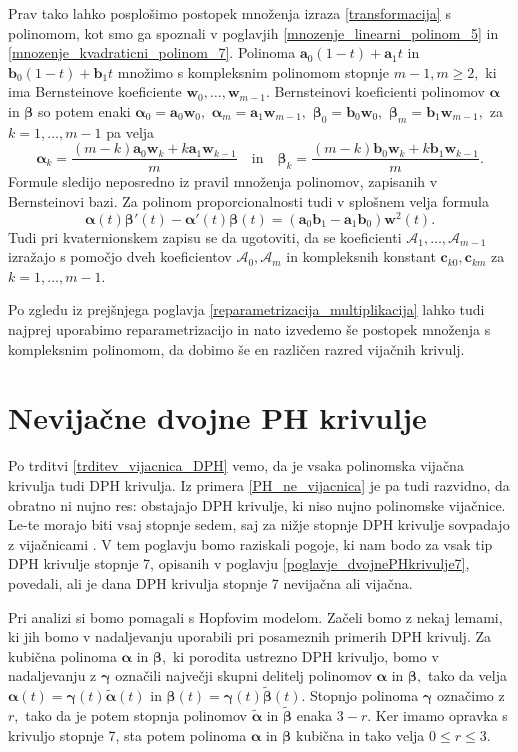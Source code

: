 \documentclass[12pt,a4paper,twoside]{article}
\theoremstyle{definition} %
\theoremstyle{plain} %
\theoremstyle{primerstyle}
\numberwithin{equation}{section}  %
\newcommand{\aV}{\mathbf{a}}
\newcommand{\bV}{\mathbf{b}}
\newcommand{\cV}{\mathbf{c}}
\newcommand{\wV}{\mathbf{w}}
\newcommand{\AQ}{\mathcal{A}}
\newcommand{\balpha}{\boldsymbol \alpha}
\newcommand{\bbeta}{\boldsymbol \beta}
\newcommand{\bgamma}{\boldsymbol \gamma}
\newcommand{\btalpha}{\tilde{\boldsymbol \alpha}}
\newcommand{\btbeta}{\tilde{\boldsymbol \beta}}
\begin{document}
Prav tako lahko posplošimo postopek množenja izraza \eqref{transformacija} s polinomom, kot smo ga spoznali v poglavjih \ref{mnozenje_linearni_polinom_5} in \ref{mnozenje_kvadraticni_polinom_7}. Polinoma $\aV_0(1-t)+\aV_1t$ in $\bV_0(1-t)+\bV_1t$ množimo s kompleksnim polinomom stopnje $m-1,m\geq2,$ ki ima Bernsteinove koeficiente $\wV_0,\dots,\wV_{m-1}.$ Bernsteinovi koeficienti polinomov $\balpha$ in $\bbeta$ so potem enaki $\balpha_0=\aV_0\wV_0,$ $\balpha_m=\aV_1\wV_{m-1},$ $\bbeta_0=\bV_0\wV_0,$ $\bbeta_m=\bV_1\wV_{m-1},$ za $k=1,\dots,m-1$ pa velja
\begin{equation*}
	\balpha_k=\frac{(m-k)\aV_0\wV_k+k\aV_1\wV_{k-1}}{m}\quad\text{in}\quad\bbeta_k=\frac{(m-k)\bV_0\wV_k+k\bV_1\wV_{k-1}}{m}.
\end{equation*}
Formule sledijo neposredno iz pravil množenja polinomov, zapisanih v Bernsteinovi bazi. Za polinom proporcionalnosti tudi v splošnem velja formula $$\balpha(t)\bbeta'(t)-\balpha'(t)\bbeta(t)=(\aV_0\bV_1-\aV_1\bV_0)\wV^2(t).$$ Tudi pri kvaternionskem zapisu se da ugotoviti, da se koeficienti $\AQ_1,\dots,\AQ_{m-1}$ izražajo s pomočjo dveh koeficientov $\AQ_0,\AQ_m$ in kompleksnih konstant $\cV_{k0},\cV_{km}$ za $k=1,\dots,m-1.$

Po zgledu iz prejšnjega poglavja \ref{reparametrizacija_multiplikacija} lahko tudi najprej uporabimo reparametrizacijo in nato izvedemo še postopek množenja s kompleksnim polinomom, da dobimo še en različen razred vijačnih krivulj.


\section{Nevijačne dvojne PH krivulje}
\label{poglavje_nevijacne}

Po trditvi \ref{trditev_vijacnica_DPH} vemo, da je vsaka polinomska vijačna krivulja tudi DPH krivulja. Iz primera \ref{PH_ne_vijacnica} je pa tudi razvidno, da obratno ni nujno res: obstajajo DPH krivulje, ki niso nujno polinomske vijačnice. Le-te morajo biti vsaj stopnje sedem, saj za nižje stopnje DPH krivulje sovpadajo z vijačnicami \cite[Izrek 1, str.\ 121]{beltranmonterde}. V tem poglavju bomo raziskali pogoje, ki nam bodo za vsak tip DPH krivulje stopnje 7, opisanih v poglavju \ref{poglavje_dvojnePHkrivulje7}, povedali, ali je dana DPH krivulja stopnje 7 nevijačna ali vijačna.

Pri analizi si bomo pomagali s Hopfovim modelom. Začeli bomo z nekaj lemami, ki jih bomo v nadaljevanju uporabili pri posameznih primerih DPH krivulj. Za kubična polinoma $\balpha$ in $\bbeta,$ ki porodita ustrezno DPH krivuljo, bomo v nadaljevanju z $\bgamma$ označili največji skupni delitelj polinomov $\balpha$ in $\bbeta,$ tako da velja $\balpha(t)=\bgamma(t)\btalpha(t)$ in $\bbeta(t)=\bgamma(t)\btbeta(t).$ Stopnjo polinoma $\bgamma$ označimo z $r,$ tako da je potem stopnja polinomov $\btalpha$ in $\btbeta$ enaka $3-r.$ Ker imamo opravka s krivuljo stopnje 7, sta potem polinoma $\balpha$ in $\bbeta$ kubična in tako velja $0\leq r \leq 3.$
\end{document}
